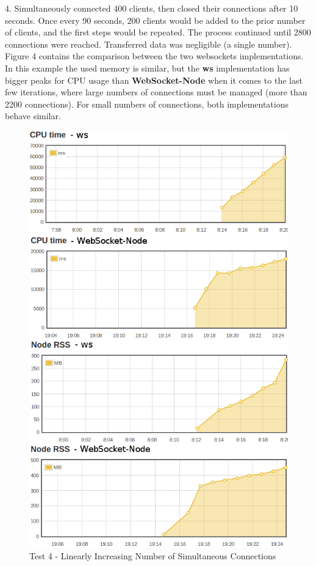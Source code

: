 \documentclass[conference]{IEEEtran}
\begin{document}
4. Simultaneously connected 400 clients, then closed their connections after 10
seconds. Once every 90 seconds, 200 clients would be added to the prior number
of clients, and the first steps would be repeated. The process continued until 2800 connections were reached. Transferred data was negligible (a single number).
Figure 4 contains the comparison between the two websockets implementations. In
this example the used memory is similar, but the \textbf{ws} implementation has
bigger peaks for CPU usage than \textbf{WebSocket-Node} when it comes to the
last few iterations, where large numbers of connections must be managed (more
than 2200 connections). For small numbers of connections, both implementations
behave similar.
\begin{frame}{}
  \begin{figure}
    \centering
	\includegraphics[width=1\linewidth]{img/test3v2.png}
    \caption{Test 4 - Linearly Increasing Number of Simultaneous Connections}
  \end{figure}
\end{frame}
\\
\end{document}
